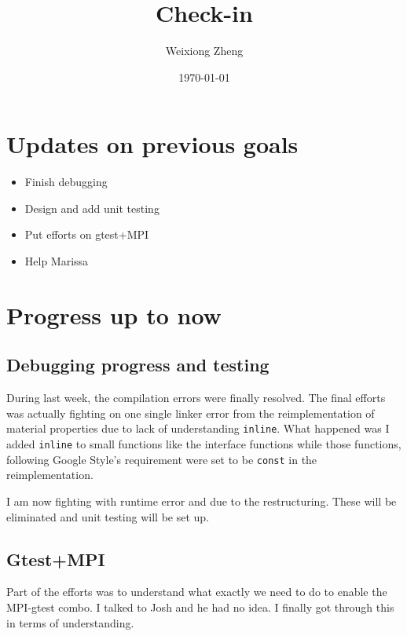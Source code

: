 \documentclass{article}
\title{Check-in} %
\author{Weixiong Zheng} %
\date{\today} %
\begin{document}
\maketitle %

\section{Updates on previous goals}
\begin{itemize}
	\item Finish debugging
	\item Design and add unit testing
	\item Put efforts on gtest+MPI
	\item Help Marissa
\end{itemize}
\section{Progress up to now}
\subsection{Debugging progress and testing}\label{debug}
During last week, the compilation errors were finally resolved. The final efforts was actually
fighting on one single linker error from the reimplementation of material properties due to 
lack of understanding {\tt inline}. What happened was I added {\tt inline} to small functions like
the interface functions while those functions, following Google Style's requirement were set
to be {\tt const} in the reimplementation. 

I am now fighting with runtime error and due to the restructuring. These will be eliminated and
unit testing will be set up.

\subsection{Gtest+MPI}
Part of the efforts was to understand what exactly we need to do to enable the MPI-gtest combo.
I talked to Josh and he had no idea. I finally got through this in terms of understanding. 
\end{document}
